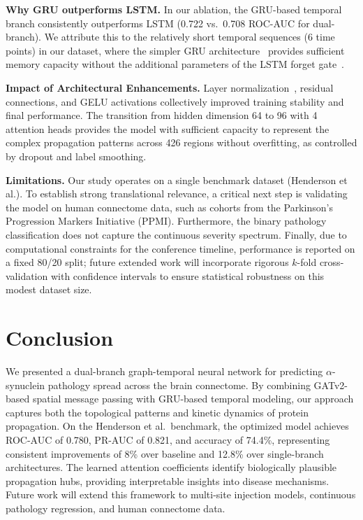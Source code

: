 \documentclass[conference]{IEEEtran}
\begin{document}
\textbf{Why GRU outperforms LSTM.} In our ablation, the GRU-based temporal branch consistently outperforms LSTM (0.722 vs.\ 0.708 ROC-AUC for dual-branch). We attribute this to the relatively short temporal sequences (6 time points) in our dataset, where the simpler GRU architecture~\cite{cho2014learning} provides sufficient memory capacity without the additional parameters of the LSTM forget gate~\cite{hochreiter1997long}.

\textbf{Impact of Architectural Enhancements.} Layer normalization~\cite{ba2016layer}, residual connections, and GELU activations collectively improved training stability and final performance. The transition from hidden dimension 64 to 96 with 4 attention heads provides the model with sufficient capacity to represent the complex propagation patterns across 426 regions without overfitting, as controlled by dropout and label smoothing.

\textbf{Limitations.} Our study operates on a single benchmark dataset (Henderson et al.). To establish strong translational relevance, a critical next step is validating the model on human connectome data, such as cohorts from the Parkinson's Progression Markers Initiative (PPMI). Furthermore, the binary pathology classification does not capture the continuous severity spectrum. Finally, due to computational constraints for the conference timeline, performance is reported on a fixed 80/20 split; future extended work will incorporate rigorous $k$-fold cross-validation with confidence intervals to ensure statistical robustness on this modest dataset size.

\section{Conclusion}

We presented a dual-branch graph-temporal neural network for predicting $\alpha$-synuclein pathology spread across the brain connectome. By combining GATv2-based spatial message passing with GRU-based temporal modeling, our approach captures both the topological patterns and kinetic dynamics of protein propagation. On the Henderson et al.\ benchmark, the optimized model achieves ROC-AUC of 0.780, PR-AUC of 0.821, and accuracy of 74.4\%, representing consistent improvements of 8\% over baseline and 12.8\% over single-branch architectures. The learned attention coefficients identify biologically plausible propagation hubs, providing interpretable insights into disease mechanisms. Future work will extend this framework to multi-site injection models, continuous pathology regression, and human connectome data.
\end{document}
